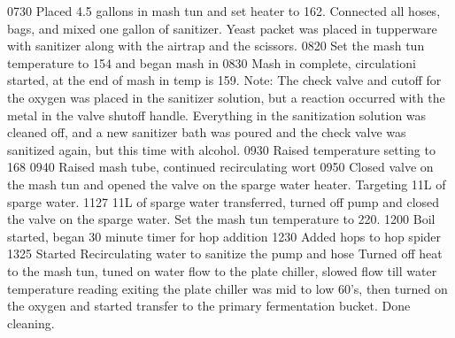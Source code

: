 \def\todaysdate{20190324}
\newday{\todaysdate}\label{\todaysdate}

0730 Placed 4.5 gallons in mash tun and set heater to 162.  Connected all hoses, bags, and mixed one gallon of sanitizer.  Yeast packet was placed in tupperware with sanitizer along with the airtrap and the scissors.
0820 Set the mash tun temperature to 154 and began mash in
0830 Mash in complete, circulationi started, at the end of mash in temp is 159.
Note:  The check valve and cutoff for the oxygen was placed in the sanitizer solution, but a reaction occurred with the metal in the valve shutoff handle.  Everything in the sanitization solution was cleaned off, and a new sanitizer bath was poured and the check valve was sanitized again, but this time with alcohol.
0930 Raised temperature setting to 168
0940 Raised mash tube, continued recirculating wort
0950 Closed valve on the mash tun and opened the valve on the sparge water heater.  Targeting 11L of sparge water.
1127 11L of sparge water transferred, turned off pump and closed the valve on the sparge water.  Set the mash tun temperature to 220.
1200 Boil started, began 30 minute timer for hop addition
1230 Added hops to hop spider
1325 Started Recirculating water to sanitize the pump and hose
 Turned off heat to the mash tun, tuned on water flow to the plate chiller, slowed flow till water temperature reading exiting the plate chiller was mid to low 60's, then turned on the oxygen and started transfer to the primary fermentation bucket.
 Done cleaning.

\def\todaysdate{20190511}
\newday{\todaysdate}\label{\todaysdate}

